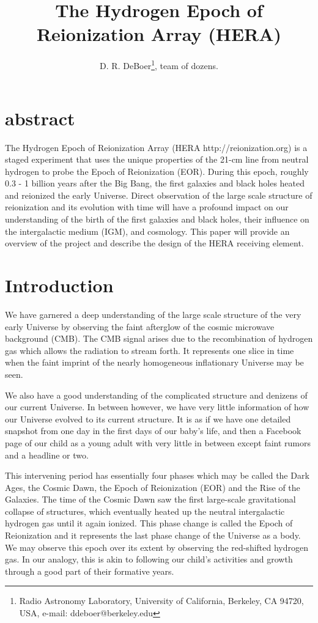 \documentclass{article}
\title{The Hydrogen Epoch of Reionization Array (HERA)}
\author{D. R. DeBoer\thanks{Radio Astronomy Laboratory, University of California, Berkeley, CA 94720, USA, e-mail: ddeboer@berkeley.edu}, 
team of dozens.
}
\begin{document}
\maketitle


\section{abstract}
\label{sec:abstract}
The Hydrogen Epoch of Reionization Array (HERA http://reionization.org) is a staged experiment that uses the unique properties of the 21-cm line from neutral hydrogen to probe the Epoch of Reionization (EOR). During this epoch, roughly 0.3 - 1 billion years after the Big Bang, the first galaxies and black holes heated and reionized the early Universe. Direct observation of the large scale structure of reionization and its evolution with time will have a profound impact on our understanding of the birth of the first galaxies and black holes, their influence on the intergalactic medium (IGM), and cosmology.  This paper will provide an overview of the project and describe the design of the HERA receiving element.

\section{Introduction}
\label{sec:intro}
We have garnered a deep understanding of the large scale structure of the very early Universe by observing the faint afterglow of the cosmic microwave background (CMB).  The CMB signal arises due to the recombination of hydrogen gas which allows the radiation to stream forth.  It represents one slice in time when the faint imprint of the nearly homogeneous inflationary Universe may be seen.

We also have a good understanding of the complicated structure and denizens of our current Universe.  In between however, we have very little information of how our Universe evolved to its current structure.  It is as if we have one detailed snapshot from one day in the first days of our baby's life, and then a Facebook page of our child as a young adult with very little in between except faint rumors and a headline or two.

This intervening period has essentially four phases which may be called the Dark Ages, the Cosmic Dawn, the Epoch of Reionization (EOR) and the Rise of the Galaxies.  The time of the Cosmic Dawn saw the first large-scale gravitational collapse of structures, which eventually heated up the neutral intergalactic hydrogen gas until it again ionized.  This phase change is called the Epoch of Reionization and it represents the last phase change of the Universe as a body.  We may observe this epoch over its extent by observing the red-shifted hydrogen gas.  In our analogy, this is akin to following our child's activities and growth through a good part of their formative years.
\end{document}
